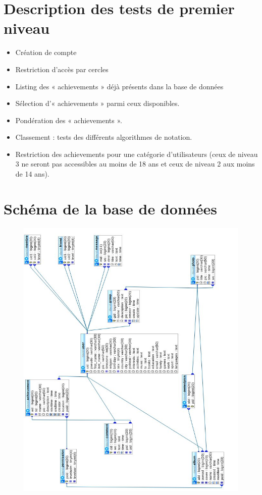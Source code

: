 \documentclass{life-fr}
\begin{document}
\section{Description des tests de premier niveau}

\begin{itemize}
  \item Création de compte
  \item Restriction d’accès par cercles
  \item Listing des « achievements » déjà présents dans la base de données
  \item Sélection d’« achievements » parmi ceux disponibles.
  \item Pondération des « achievements ».
  \item Classement : tests des différents algorithmes de notation.
  \item Restriction des achievements pour une catégorie d’utilisateurs (ceux de niveau 3 ne seront pas accessibles au moins de 18 ans et ceux de niveau 2 aux moins de 14 ans).
\end{itemize}

\section{Schéma de la base de données}

\begin{figure}[H]
  \begin{center}
    \includegraphics[width=18cm]{img/imgdb.jpg}
  \end{center}
\end{figure}
\end{document}
